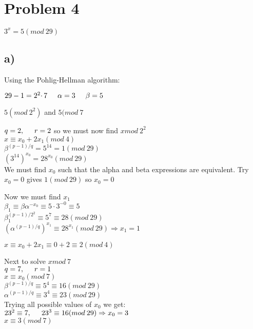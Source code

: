 \documentclass{article}
\begin{document}
\section*{Problem 4}

$3^{x} = 5(mod \: 29)$

\subsection*{a)}
Using the Pohlig-Hellman algorithm:

$29-1 = 2^{2} \cdotp 7 \hspace{5mm} \alpha = 3 \hspace{5mm} \beta = 5$

$5 (mod \: 2^{2})$ and $5 (mod \: 7$

$q=2, \hspace{5mm} r=2$ so we must now find $x mod \: 2^{2}$\\
$x \equiv x_{0} + 2x_{1} (mod \: 4)$\\
$\beta^{(p-1)/q} = 5^{14} = 1 (mod \: 29)$\\
$(3^{14})^{x_{0}} = 28^{x_{0}} (mod \: 29)$\\
We must find $x_{0}$ such that the alpha and beta expressions are equivalent.
Try $x_{0} = 0$ gives $1 (mod \: 29)$ so $x_{0} = 0$

Now we must find $x_{1}$\\
$\beta_{1} \equiv \beta \alpha^{-x_{0}} \equiv 5 \cdotp 3^{-0} \equiv 5$\\
$\beta_{1}^{(p-1)/2^{2}} \equiv 5^{7} \equiv 28 (mod \: 29)$\\
$(\alpha^{(p-1)/q})^{x_{1}} \equiv 28^{x_{1}} (mod \: 29) \Rightarrow x_{1} = 1$

$x \equiv x_{0} + 2x_{1} \equiv 0 + 2 \equiv 2 (mod \: 4)$

Next to solve $x mod \: 7$\\
$q=7, \hspace{5mm} r=1$\\
$x \equiv x_{0} (mod \: 7)$\\
$\beta^{(p-1)/q} \equiv 5^{4} \equiv 16 (mod \: 29)$\\
$\alpha^{(p-1)/q} \equiv 3^{4} \equiv 23 (mod \: 29)$\\

Trying all possible values of $x_{0}$ we get:\\
$23^{2} \equiv 7, \hspace{5mm} 23^{3} \equiv 16 (mod \: 29) \Rightarrow x_{0} = 3$\\
$x \equiv 3 (mod \: 7)$
\end{document}
